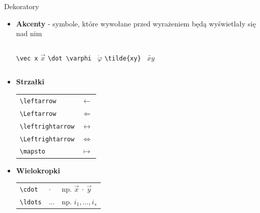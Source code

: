 \documentclass{beamer}
\theoremstyle{newblock}
\begin{document}
\begin{frame}[fragile]{Dekoratory}

    \begin{itemize}
        \item \textbf{Akcenty} - symbole, które wywołane przed wyrażeniem będą wyświetlały się nad nim
        
    \begin{columns}
        
            \centering
            \verb|\vec x| $\vec x$ 
            \centering
            \verb|\dot \varphi | $\dot \varphi$
            \centering
            \verb|\tilde{xy} | $\tilde {xy}$
    \end{columns}

    \item \textbf{Strzałki}

    \begin{table}[]
        \centering
        \begin{tabular}{l l}
             \verb|\leftarrow| & $\leftarrow$ \\
             \verb|\Leftarrow| & $\Leftarrow$\\
             \verb|\leftrightarrow| & $\leftrightarrow$\\
             \verb|\Leftrightarrow| & $\Leftrightarrow$\\
             \verb|\mapsto| & $\mapsto$
        \end{tabular}
        \label{tab:strzałki}
    \end{table}

    \item{\textbf{Wielokropki}}

    \begin{table}[]
        \centering
        \begin{tabular}{l l l}
            \verb|\cdot| & $\cdot$ & np. $\vec x \ \cdot \ \vec y$ \\
            \verb|\ldots| & $\ldots$ & np. $ i_1, \ldots, i_s$
        \end{tabular}
        \label{tab:wielokropki}
    \end{table}
    
    \end{itemize}
\end{frame}
\end{document}
